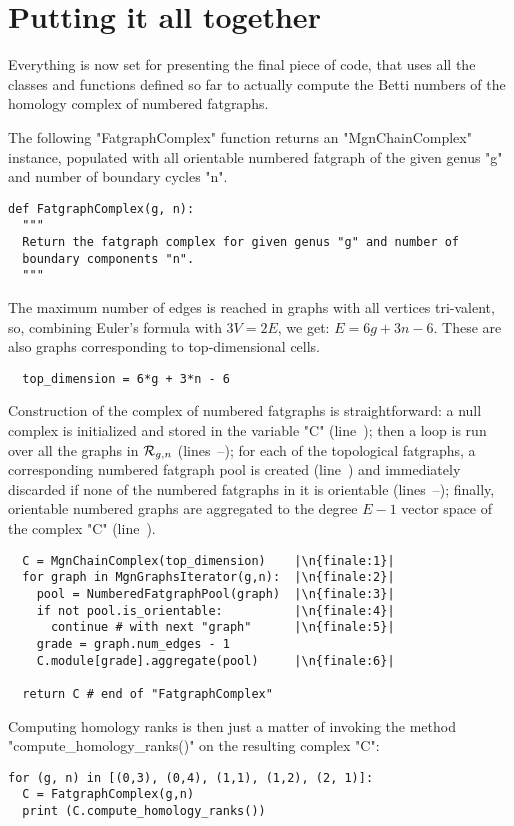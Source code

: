\section{Putting it all together}
\label{sec:algorithm-finale}

Everything is now set for presenting the final piece of code, that
uses all the classes and functions defined so far to actually compute
the Betti numbers of the homology complex of numbered fatgraphs.

The following "FatgraphComplex" function returns an "MgnChainComplex"
instance, populated with all orientable numbered fatgraph of the given
genus "g" and number of boundary cycles "n".  
\begin{lstlisting}
def FatgraphComplex(g, n):
  """
  Return the fatgraph complex for given genus "g" and number of
  boundary components "n".
  """
\end{lstlisting}
The maximum number of edges is reached in graphs with all vertices
tri-valent, so, combining Euler's formula with $3V = 2E$, we
get: $E = 6g + 3n - 6$.  These are also graphs corresponding
to top-dimensional cells.
\begin{lstlisting}
  top_dimension = 6*g + 3*n - 6

\end{lstlisting}
Construction of the complex of numbered fatgraphs is
straightforward: a null complex is initialized and stored in the
variable "C" (line~); then a loop is run over all the
graphs in $\mathcal{R}_{g,n}$ (lines~--); for each of
the topological fatgraphs, a corresponding numbered fatgraph pool is
created (line~) and immediately discarded if none of the
numbered fatgraphs in it is orientable
(lines~--); finally, orientable numbered
graphs are aggregated to the degree $E-1$ vector space of the complex
"C" (line~).
\begin{lstlisting}
  C = MgnChainComplex(top_dimension)    |\n{finale:1}|
  for graph in MgnGraphsIterator(g,n):  |\n{finale:2}|
    pool = NumberedFatgraphPool(graph)  |\n{finale:3}|
    if not pool.is_orientable:          |\n{finale:4}|
      continue # with next "graph"      |\n{finale:5}|
    grade = graph.num_edges - 1
    C.module[grade].aggregate(pool)     |\n{finale:6}|
    
  return C # end of "FatgraphComplex"
\end{lstlisting}

Computing homology ranks is then just a matter of invoking the method
"compute_homology_ranks()" on the resulting complex "C":
\begin{lstlisting}
for (g, n) in [(0,3), (0,4), (1,1), (1,2), (2, 1)]:
  C = FatgraphComplex(g,n)
  print (C.compute_homology_ranks())
\end{lstlisting}


